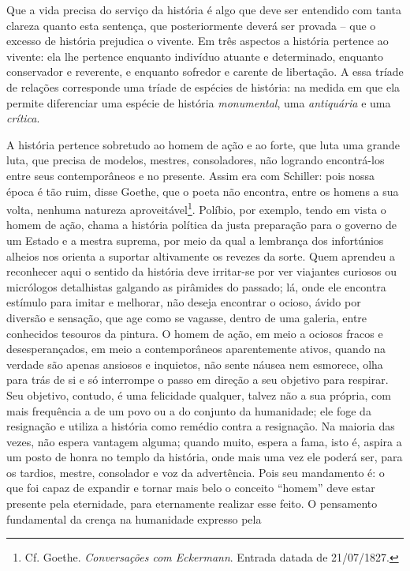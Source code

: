 Que a vida precisa do serviço da história é algo que deve ser entendido
com tanta clareza quanto esta sentença, que posteriormente deverá ser
provada -- que o excesso de história prejudica o vivente. Em três
aspectos a história pertence ao vivente: ela lhe pertence enquanto
indivíduo atuante e determinado, enquanto conservador e reverente, e
enquanto sofredor e carente de libertação. A essa tríade de relações
corresponde uma tríade de espécies de história: na medida em que ela
permite diferenciar uma espécie de história \emph{monumental}, uma
\emph{antiquária} e uma \emph{crítica}.

A história pertence sobretudo ao homem de ação e ao forte, que luta uma
grande luta, que precisa de modelos, mestres, consoladores, não logrando
encontrá-los entre seus contemporâneos e no presente. Assim era com
Schiller: pois nossa época é tão ruim, disse Goethe, que o poeta não
encontra, entre os homens a sua volta, nenhuma natureza
aproveitável\footnote{Cf. Goethe. \emph{Conversações com Eckermann}.
  Entrada datada de 21/07/1827.}. Políbio, por exemplo, tendo em vista o
homem de ação, chama a história política da justa preparação para o
governo de um Estado e a mestra suprema, por meio da qual a lembrança
dos infortúnios alheios nos orienta a suportar altivamente os revezes da
sorte. Quem aprendeu a reconhecer aqui o sentido da história deve
irritar-se por ver viajantes curiosos ou micrólogos detalhistas galgando
as pirâmides do passado; lá, onde ele encontra estímulo para imitar e
melhorar, não deseja encontrar o ocioso, ávido por diversão e sensação,
que age como se vagasse, dentro de uma galeria, entre conhecidos
tesouros da pintura. O homem de ação, em meio a ociosos fracos e
desesperançados, em meio a contemporâneos aparentemente ativos, quando
na verdade são apenas ansiosos e inquietos, não sente náusea nem
esmorece, olha para trás de si e só interrompe o passo em direção a seu
objetivo para respirar. Seu objetivo, contudo, é uma felicidade
qualquer, talvez não a sua própria, com mais frequência a de um povo ou
a do conjunto da humanidade; ele foge da resignação e utiliza a história
como remédio contra a resignação. Na maioria das vezes, não espera
vantagem alguma; quando muito, espera a fama, isto é, aspira a um posto
de honra no templo da história, onde mais uma vez ele poderá ser, para
os tardios, mestre, consolador e voz da advertência. Pois seu mandamento
é: o que foi capaz de expandir e tornar mais belo o conceito ``homem''
deve estar presente pela eternidade, para eternamente realizar esse
feito. O pensamento fundamental da crença na humanidade expresso pela
